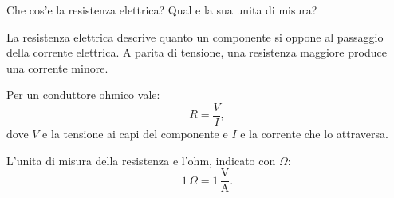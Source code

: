 
\begin{esercizio}
Che cos'e la resistenza elettrica? Qual e la sua unita di misura?
\end{esercizio}

\begin{soluzione}
La resistenza elettrica descrive quanto un componente si oppone al passaggio
della corrente elettrica. A parita di tensione, una resistenza maggiore produce
una corrente minore.

Per un conduttore ohmico vale:
\[
R=\frac{V}{I},
\]
dove \(V\) e la tensione ai capi del componente e \(I\) e la corrente che lo
attraversa.

L'unita di misura della resistenza e l'ohm, indicato con \(\Omega\):
\[
1\,\Omega = 1\,\frac{\mathrm{V}}{\mathrm{A}}.
\]
\end{soluzione}
